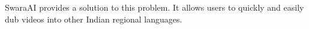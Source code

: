 \documentclass[preview]{standalone}
\begin{document}
\begin{flushleft}
\fontsize{15}{0}\selectfont SwaraAI provides a solution to this problem. It allows users to quickly and easily dub videos into other Indian regional languages.
\end{flushleft}
\end{document}
